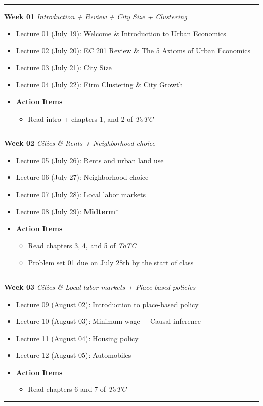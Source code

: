 \documentclass[11pt]{article}
\begin{document}
	\noindent\rule[0.5ex]{\linewidth}{1pt}
	\textbf{Week 01} \textit{Introduction + Review + City Size + Clustering}
	\begin{itemize}
		\item Lecture 01 (July 19): Welcome \& Introduction to Urban Economics
		\item Lecture 02 (July 20): EC 201 Review \& The 5 Axioms of Urban Economics
		\item Lecture 03 (July 21): City Size
		\item Lecture 04 (July 22):  Firm Clustering \& City Growth
		\item[]\underline{\textbf{Action Items}}
		\begin{itemize}
			\item Read intro + chapters 1, and 2 of \textit{ToTC}
		\end{itemize}
	\end{itemize}
	\noindent\rule[0.5ex]{\linewidth}{1pt}
	
	\textbf{Week 02} \textit{Cities \& Rents + Neighborhood choice}
	\begin{itemize}
		\item Lecture 05 (July 26): Rents and urban land use
		\item Lecture 06 (July 27): Neighborhood choice 
		\item Lecture 07 (July 28): Local labor markets
		\item Lecture 08 (July 29):  \textbf{Midterm}*
		\item[]\underline{\textbf{Action Items}}
		\begin{itemize}
				\item Read chapters 3, 4, and 5 of \textit{ToTC}
				\item Problem set 01 due on July 28th by the start of class
		\end{itemize}
	\end{itemize}
	\noindent\rule[0.5ex]{\linewidth}{1pt}
	
		\textbf{Week 03} \textit{Cities \& Local labor markets + Place based policies}
	\begin{itemize}
		\item Lecture 09 (August 02): Introduction to place-based policy
		\item Lecture 10 (August 03): Minimum wage + Causal inference
		\item Lecture 11 (August 04): Housing policy
		\item Lecture 12 (August 05): Automobiles
		\item[]\underline{\textbf{Action Items}}
		\begin{itemize}
				\item Read chapters 6 and 7 of \textit{ToTC}
		\end{itemize}
	\end{itemize}
	\noindent\rule[0.5ex]{\linewidth}{1pt}
	
\end{document}
